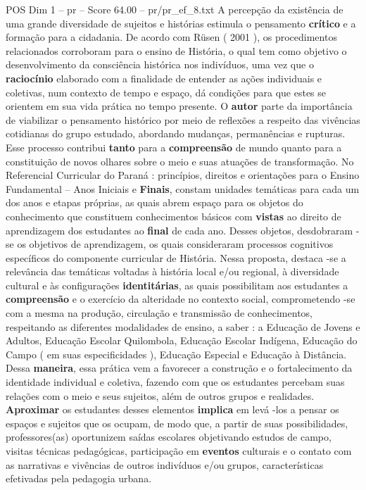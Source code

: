 \begin{textsample}{POS Dim 1 – pr – Score 64.00 – pr/pr\_ef\_8.txt}
A percepção da existência de uma grande diversidade de sujeitos e histórias estimula o pensamento \textbf{crítico} e a formação para a cidadania.
De acordo com Rüsen ( 2001 ), os procedimentos relacionados corroboram para o ensino de História, o qual tem como objetivo o desenvolvimento da consciência histórica nos indivíduos, uma vez que o \textbf{raciocínio} elaborado com a finalidade de entender as ações individuais e coletivas, num contexto de tempo e espaço, dá condições para que estes se orientem em sua vida prática no tempo presente.
O \textbf{autor} parte da importância de viabilizar o pensamento histórico por meio de reflexões a respeito das vivências cotidianas do grupo estudado, abordando mudanças, permanências e rupturas.
Esse processo contribui \textbf{tanto} para a \textbf{compreensão} de mundo quanto para a constituição de novos olhares sobre o meio e suas atuações de transformação.
No Referencial Curricular do Paraná : princípios, direitos e orientações para o Ensino Fundamental – Anos Iniciais e \textbf{Finais}, constam unidades temáticas para cada um dos anos e etapas próprias, as quais abrem espaço para os objetos do conhecimento que constituem conhecimentos básicos com \textbf{vistas} ao direito de aprendizagem dos estudantes ao \textbf{final} de cada ano.
Desses objetos, desdobraram -se os objetivos de aprendizagem, os quais consideraram processos cognitivos específicos do componente curricular de História.
Nessa proposta, destaca -se a relevância das temáticas voltadas à história local e/ou regional, à diversidade cultural e às configurações \textbf{identitárias}, as quais possibilitam aos estudantes a \textbf{compreensão} e o exercício da alteridade no contexto social, comprometendo -se com a mesma na produção, circulação e transmissão de conhecimentos, respeitando as diferentes modalidades de ensino, a saber : a Educação de Jovens e Adultos, Educação Escolar Quilombola, Educação Escolar Indígena, Educação do Campo ( em suas especificidades ), Educação Especial e Educação à Distância.
Dessa \textbf{maneira}, essa prática vem a favorecer a construção e o fortalecimento da identidade individual e coletiva, fazendo com que os estudantes percebam suas relações com o meio e seus sujeitos, além de outros grupos e realidades. \textbf{Aproximar} os estudantes desses elementos \textbf{implica} em levá -los a pensar os espaços e sujeitos que os ocupam, de modo que, a partir de suas possibilidades, professores(as) oportunizem saídas escolares objetivando estudos de campo, visitas técnicas pedagógicas, participação em \textbf{eventos} culturais e o contato com as narrativas e vivências de outros indivíduos e/ou grupos, características efetivadas pela pedagogia urbana.

\end{textsample}
